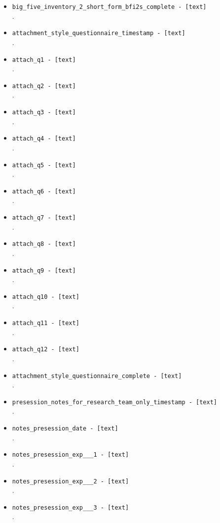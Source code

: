 \begin{description}
\begin{addmargin}[0em]{0em}
\begin{addmargin}[1em]{0em}
\begin{itemize}
            \item \verb|big_five_inventory_2_short_form_bfi2s_complete - [text]|\\.
            \item \verb|attachment_style_questionnaire_timestamp - [text]|\\.
            \item \verb|attach_q1 - [text]|\\.
            \item \verb|attach_q2 - [text]|\\.
            \item \verb|attach_q3 - [text]|\\.
            \item \verb|attach_q4 - [text]|\\.
            \item \verb|attach_q5 - [text]|\\.
            \item \verb|attach_q6 - [text]|\\.
            \item \verb|attach_q7 - [text]|\\.
            \item \verb|attach_q8 - [text]|\\.
            \item \verb|attach_q9 - [text]|\\.
            \item \verb|attach_q10 - [text]|\\.
            \item \verb|attach_q11 - [text]|\\.
            \item \verb|attach_q12 - [text]|\\.
            \item \verb|attachment_style_questionnaire_complete - [text]|\\.
            \item \verb|presession_notes_for_research_team_only_timestamp - [text]|\\.
            \item \verb|notes_presession_date - [text]|\\.
            \item \verb|notes_presession_exp___1 - [text]|\\.
            \item \verb|notes_presession_exp___2 - [text]|\\.
            \item \verb|notes_presession_exp___3 - [text]|\\.

\end{itemize}
\end{addmargin}
\end{addmargin}
\end{description}
